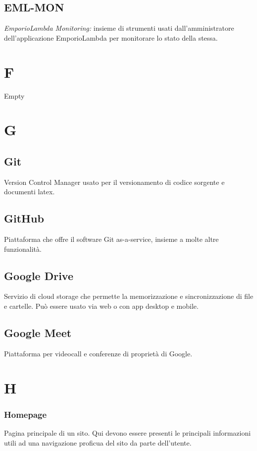 \subsection*{EML-MON}
\textit{EmporioLambda Monitoring:} insieme di strumenti usati dall'amministratore dell'applicazione EmporioLambda
per monitorare lo stato della stessa.

\section*{F}
Empty

\section*{G}
\subsection*{Git}
Version Control Manager usato per il versionamento di codice sorgente e documenti latex.

\subsection*{GitHub}
Piattaforma che offre il software Git as-a-service, insieme a molte altre funzionalità.

\subsection*{Google Drive}
Servizio di cloud storage che permette la memorizzazione e sincronizzazione di file e cartelle. Può essere usato via web o con app desktop e mobile.

\subsection*{Google Meet}
Piattaforma per videocall e conferenze di proprietà di Google.

\section*{H}
\subsubsection*{Homepage}
Pagina principale di un sito. Qui devono essere presenti le principali informazioni utili ad una navigazione proficua del
sito da parte dell'utente.

